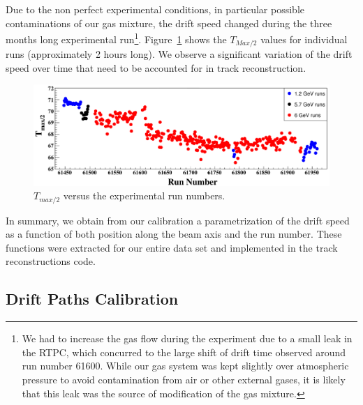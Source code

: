 \documentclass[preprint,5p]{elsarticle}
\begin{document}
Due to the non perfect experimental conditions, in particular possible contaminations 
of our gas mixture, the drift speed changed during the three months long experimental 
run\footnote{We had to increase the gas flow during the experiment due to a small leak 
in the RTPC, which concurred to the large shift of drift time observed around run number 
61600. While our gas system was kept slightly over 
atmospheric pressure to avoid contamination from air or other external gases, it 
is likely that this leak was the source of modification of the gas mixture.}.  
Figure~\ref{fig:Drift_run_number_1} shows the $T_{Max/2}$ values for 
individual runs (approximately 2 hours long). We observe a significant 
variation of the drift speed over time that need to be accounted for 
in track reconstruction.

\begin{figure}[tb]
\centering
\includegraphics[width=16.5cm]{fig_2017/Drift_run_number.pdf}
\caption{$T_{max/2}$ versus the experimental run numbers.} 
\label{fig:Drift_run_number_1}
\end{figure}


In summary, we obtain from our calibration a parame\-tri\-zation of the drift speed 
as a function of both position along the beam axis and the run number. These 
functions were extracted for our entire data set and implemented in the 
track reconstructions code.
   
\subsection{Drift Paths Calibration}
\end{document}

